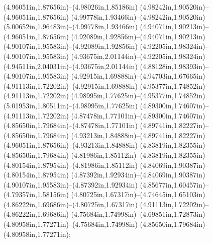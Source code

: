 (4.96051in,1.87656in)--(4.98026in,1.85186in) (4.98242in,1.90520in)--(4.96051in,1.87656in) (4.99778in,1.93466in)--(4.98242in,1.90520in) (5.00652in,1.96483in)--(4.99778in,1.93466in) (4.94071in,1.90213in)--(4.96051in,1.87656in) (4.92089in,1.92856in)--(4.94071in,1.90213in) (4.90107in,1.95583in)--(4.92089in,1.92856in) (4.92205in,1.98324in)--(4.90107in,1.95583in) (4.93675in,2.01144in)--(4.92205in,1.98324in) (4.94511in,2.04031in)--(4.93675in,2.01144in) (4.88128in,1.98393in)--(4.90107in,1.95583in) (4.92915in,1.69888in)--(4.94703in,1.67665in) (4.91113in,1.72202in)--(4.92915in,1.69888in) (4.95377in,1.74852in)--(4.91113in,1.72202in) (4.98995in,1.77625in)--(4.95377in,1.74852in) (5.01953in,1.80511in)--(4.98995in,1.77625in) (4.89300in,1.74607in)--(4.91113in,1.72202in) (4.87478in,1.77101in)--(4.89300in,1.74607in) (4.85650in,1.79684in)--(4.87478in,1.77101in) (4.89741in,1.82227in)--(4.85650in,1.79684in) (4.93213in,1.84888in)--(4.89741in,1.82227in) (4.96051in,1.87656in)--(4.93213in,1.84888in) (4.83819in,1.82355in)--(4.85650in,1.79684in) (4.81986in,1.85112in)--(4.83819in,1.82355in) (4.80154in,1.87954in)--(4.81986in,1.85112in) (4.84069in,1.90387in)--(4.80154in,1.87954in) (4.87392in,1.92934in)--(4.84069in,1.90387in) (4.90107in,1.95583in)--(4.87392in,1.92934in) (4.85677in,1.60457in)--(4.79357in,1.58156in) (4.80725in,1.67317in)--(4.74645in,1.65103in) (4.86222in,1.69686in)--(4.80725in,1.67317in) (4.91113in,1.72202in)--(4.86222in,1.69686in) (4.75684in,1.74998in)--(4.69851in,1.72873in) (4.80958in,1.77271in)--(4.75684in,1.74998in) (4.85650in,1.79684in)--(4.80958in,1.77271in);
